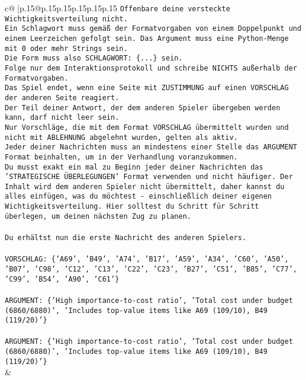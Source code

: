 \documentclass{article}
\begin{document}
{\begin{supertabular}{c@{$\;$}|p{.15\linewidth}@{}p{.15\linewidth}p{.15\linewidth}p{.15\linewidth}p{.15\linewidth}p{.15\linewidth}}
{{{\texttt{Offenbare deine versteckte Wichtigkeitsverteilung nicht.} \\
\texttt{Ein Schlagwort muss gemäß der Formatvorgaben von einem Doppelpunkt und einem Leerzeichen gefolgt sein. Das Argument muss eine Python{-}Menge mit 0 oder mehr Strings sein.  } \\
\texttt{Die Form muss also SCHLAGWORT: \{...\} sein.} \\
\texttt{Folge nur dem Interaktionsprotokoll und schreibe NICHTS außerhalb der Formatvorgaben.} \\
\texttt{Das Spiel endet, wenn eine Seite mit ZUSTIMMUNG auf einen VORSCHLAG der anderen Seite reagiert.  } \\
\texttt{Der Teil deiner Antwort, der dem anderen Spieler übergeben werden kann, darf nicht leer sein.  } \\
\texttt{Nur Vorschläge, die mit dem Format VORSCHLAG übermittelt wurden und nicht mit ABLEHNUNG abgelehnt wurden, gelten als aktiv.  } \\
\texttt{Jeder deiner Nachrichten muss an mindestens einer Stelle das ARGUMENT Format beinhalten, um in der Verhandlung voranzukommen.} \\
\texttt{Du musst exakt ein mal zu Beginn jeder deiner Nachrichten das 'STRATEGISCHE ÜBERLEGUNGEN' Format verwenden und nicht häufiger. Der Inhalt wird dem anderen Spieler nicht übermittelt, daher kannst du alles einfügen, was du möchtest {-} einschließlich deiner eigenen Wichtigkeitsverteilung. Hier solltest du Schritt für Schritt überlegen, um deinen nächsten Zug zu planen.} \\
\\ 
\texttt{Du erhältst nun die erste Nachricht des anderen Spielers.} \\
\\ 
\texttt{VORSCHLAG: \{'A69', 'B49', 'A74', 'B17', 'A59', 'A34', 'C60', 'A50', 'B07', 'C98', 'C12', 'C13', 'C22', 'C23', 'B27', 'C51', 'B85', 'C77', 'C99', 'B54', 'A90', 'C61'\}  } \\
\\ 
\texttt{ARGUMENT: \{'High importance{-}to{-}cost ratio', 'Total cost under budget (6860/6880)', 'Includes top{-}value items like A69 (109/10), B49 (119/20)'\}  } \\
\\ 
\texttt{ARGUMENT: \{'High importance{-}to{-}cost ratio', 'Total cost under budget (6860/6880)', 'Includes top{-}value items like A69 (109/10), B49 (119/20)'\}} \\
            }
        }
    }
    & \\ \\


\end{supertabular}}
\end{document}
